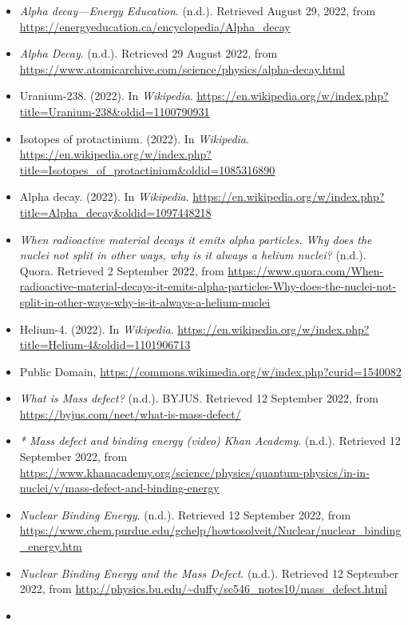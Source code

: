 \documentclass[
]{article}
\providecommand{\tightlist}{%
  \setlength{\itemsep}{0pt}\setlength{\parskip}{0pt}}
\begin{document}
\begin{itemize}
\tightlist
\item
  \emph{Alpha decay---Energy Education}. (n.d.). Retrieved August 29,
  2022, from \url{https://energyeducation.ca/encyclopedia/Alpha_decay}
\item
  \emph{Alpha Decay}. (n.d.). Retrieved 29 August 2022, from
  \url{https://www.atomicarchive.com/science/physics/alpha-decay.html}
\item
  Uranium-238. (2022). In \emph{Wikipedia}.
  \url{https://en.wikipedia.org/w/index.php?title=Uranium-238\&oldid=1100790931}
\item
  Isotopes of protactinium. (2022). In \emph{Wikipedia}.
  \url{https://en.wikipedia.org/w/index.php?title=Isotopes_of_protactinium\&oldid=1085316890}
\item
  Alpha decay. (2022). In \emph{Wikipedia}.
  \url{https://en.wikipedia.org/w/index.php?title=Alpha_decay\&oldid=1097448218}
\item
  \emph{When radioactive material decays it emits alpha particles. Why
  does the nuclei not split in other ways, why is it always a helium
  nuclei?} (n.d.). Quora. Retrieved 2 September 2022, from
  \url{https://www.quora.com/When-radioactive-material-decays-it-emits-alpha-particles-Why-does-the-nuclei-not-split-in-other-ways-why-is-it-always-a-helium-nuclei}
\item
  Helium-4. (2022). In \emph{Wikipedia}.
  \url{https://en.wikipedia.org/w/index.php?title=Helium-4\&oldid=1101906713}
\item
  Public Domain,
  \url{https://commons.wikimedia.org/w/index.php?curid=1540082}
\item
  \emph{What is Mass defect?} (n.d.). BYJUS. Retrieved 12 September
  2022, from \url{https://byjus.com/neet/what-is-mass-defect/}
\item
  \emph{* Mass defect and binding energy (video) \textbar{} Khan
  Academy}. (n.d.). Retrieved 12 September 2022, from
  \url{https://www.khanacademy.org/science/physics/quantum-physics/in-in-nuclei/v/mass-defect-and-binding-energy}
\item
  \emph{Nuclear Binding Energy}. (n.d.). Retrieved 12 September 2022,
  from
  \url{https://www.chem.purdue.edu/gchelp/howtosolveit/Nuclear/nuclear_binding_energy.htm}
\item
  \emph{Nuclear Binding Energy and the Mass Defect}. (n.d.). Retrieved
  12 September 2022, from
  \url{http://physics.bu.edu/~duffy/sc546_notes10/mass_defect.html}
\item

\end{itemize}
\end{document}
